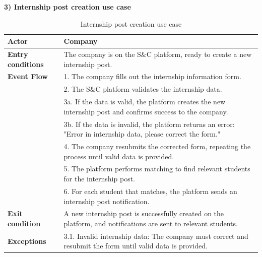 \newpage
\textbf{3) Internship post creation use case}\\

\begin{table}[h!]
    \centering
    \begin{tabular}{lp{10cm}}
        \textbf{Actor} & Company \\ \hline
        \textbf{Entry conditions} & The company is on the S\&C platform, ready to create a new internship post. \\ \hline
        \textbf{Event Flow} & 
        1. The company fills out the internship information form. \\
        & 2. The S\&C platform validates the internship data. \\
        & 3a. If the data is valid, the platform creates the new internship post and confirms success to the company. \\
        & 3b. If the data is invalid, the platform returns an error: "Error in internship data, please correct the form." \\
        & 4. The company resubmits the corrected form, repeating the process until valid data is provided. \\
        & 5. The platform performs matching to find relevant students for the internship post. \\
        & 6. For each student that matches, the platform sends an internship post notification. \\
        \hline
        \textbf{Exit condition} & A new internship post is successfully created on the platform, and notifications are sent to relevant students. \\ \hline
        \textbf{Exceptions} & 
        3.1. Invalid internship data: The company must correct and resubmit the form until valid data is provided. \\
    \end{tabular}
    \caption{Internship post creation use case}
    \label{tab:internship_post_creation}
\end{table}



